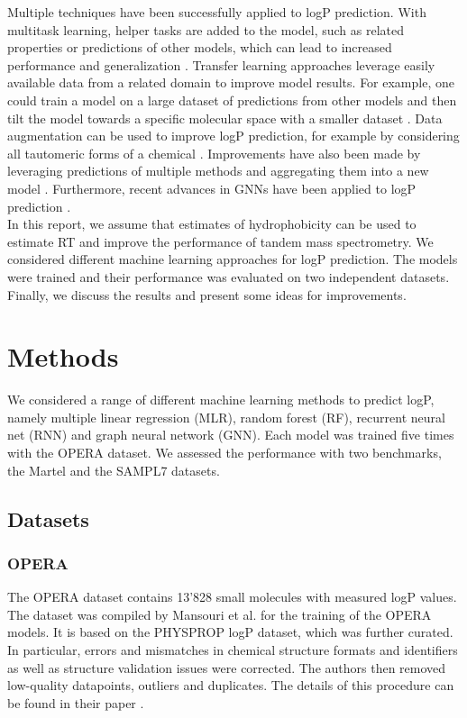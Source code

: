 \documentclass{article}
\begin{document}
Multiple techniques have been successfully applied to logP prediction. With multitask learning, helper tasks are added to the model, such as related properties or predictions of other models, which can lead to increased performance and generalization \cite{lenselink2021multitask, capela2019multitask}. Transfer learning approaches leverage easily available data from a related domain to improve model results. For example, one could train a model on a large dataset of predictions from other models and then tilt the model towards a specific molecular space with a smaller dataset \cite{chen2021mrlogp}. Data augmentation can be used to improve logP prediction, for example by considering all tautomeric forms of a chemical \cite{ulrich2021exploring}. Improvements have also been made by leveraging predictions of multiple methods and aggregating them into a new model \cite{plante2018jplogp}. Furthermore, recent advances in GNNs have been applied to logP prediction \cite{wieder2020compact}. \\

In this report, we assume that estimates of hydrophobicity can be used to estimate RT and improve the performance of tandem mass spectrometry. We considered different machine learning approaches for logP prediction. The models were trained and their performance was evaluated on two independent datasets. Finally, we discuss the results and present some ideas for improvements.

\section{Methods}

We considered a range of different machine learning methods to predict logP, namely multiple linear regression (MLR), random forest (RF), recurrent neural net (RNN) and graph neural network (GNN). Each model was trained five times with the OPERA dataset. We assessed the performance with two benchmarks, the Martel and the SAMPL7 datasets.

\subsection{Datasets}
\subsubsection{OPERA}

The OPERA dataset contains 13'828 small molecules with measured logP values. The dataset was compiled by Mansouri et al. for the training of the OPERA models. It is based on the PHYSPROP logP dataset, which was further curated. In particular, errors and mismatches in chemical structure formats and identifiers as well as structure validation issues were corrected. The authors then removed low-quality datapoints, outliers and duplicates. The details of this procedure can be found in their paper \cite{mansouri2018opera}. \\
\end{document}
